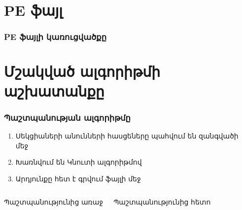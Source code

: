 \documentclass[11pt]{beamer}
\begin{document}
\section{PE ֆայլ}

\begin{frame}\frametitle{PE ֆայլի կառուցվածքը}
\end{frame}

\section{Մշակված ալգորիթմի աշխատանքը}

\begin{frame}\frametitle{Պաշտպանության ալգորիթմը}
\begin{enumerate}
\item Սեկցիաների անունների հասցեները պահվում են զանգվածի մեջ
\item Խառնվում են Կնուտի ալգորիթմով
\item Արդյունքը հետ է գրվում ֆայլի մեջ
\end{enumerate}
\begin{columns}[t]
\begin{block}{\small{Պաշտպանությունից առաջ}}
\begin{figure}[p]
\centering
\end{figure}
\end{block}
\begin{block}{\small{Պաշտպանությունից հետո}}
\begin{figure}[p]
\centering
\end{figure}
\end{block}
\end{columns}
\end{frame}
\end{document}
